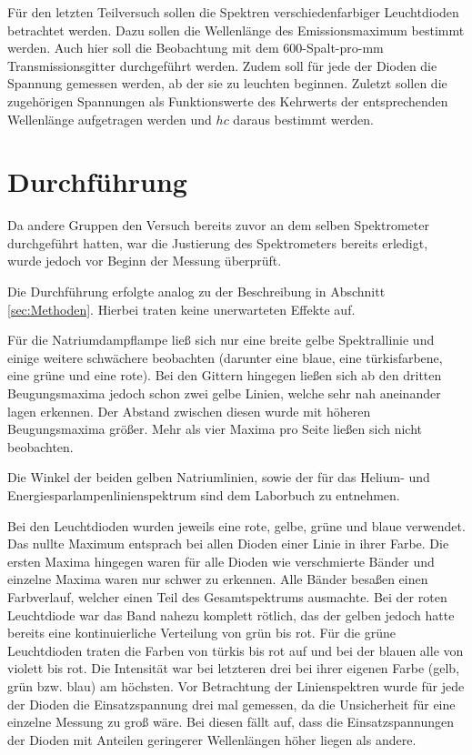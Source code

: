	Für den letzten Teilversuch sollen die Spektren verschiedenfarbiger Leuchtdioden betrachtet werden.
	Dazu sollen die Wellenlänge des Emissionsmaximum bestimmt werden.
	Auch hier soll die Beobachtung mit dem 600-Spalt-pro-\si{\milli\meter} Transmissionsgitter durchgeführt werden.
	Zudem soll für jede der Dioden die Spannung gemessen werden, ab der sie zu leuchten beginnen.
	Zuletzt sollen die zugehörigen Spannungen als Funktionswerte des Kehrwerts der entsprechenden Wellenlänge aufgetragen werden und $hc$ daraus bestimmt werden.
	
\section{Durchführung}
		
	Da andere Gruppen den Versuch bereits zuvor an dem selben Spektrometer durchgeführt hatten, war die Justierung des Spektrometers bereits erledigt, wurde jedoch vor Beginn der Messung überprüft.
	
	Die Durchführung erfolgte analog zu der Beschreibung in Abschnitt \ref{sec:Methoden}.
	Hierbei traten keine unerwarteten Effekte auf.
	
	Für die Natriumdampflampe ließ sich nur eine breite gelbe Spektrallinie und einige weitere schwächere beobachten (darunter eine blaue, eine türkisfarbene, eine grüne und eine rote).
	Bei den Gittern hingegen ließen sich ab den dritten Beugungsmaxima jedoch schon zwei gelbe Linien, welche sehr nah aneinander lagen erkennen.
	Der Abstand zwischen diesen wurde mit höheren Beugungsmaxima größer.
	Mehr als vier Maxima pro Seite ließen sich nicht beobachten.
	
	Die Winkel der beiden gelben Natriumlinien, sowie der für das Helium- und Energiesparlampenlinienspektrum sind dem Laborbuch zu entnehmen.
	
	Bei den Leuchtdioden wurden jeweils eine rote, gelbe, grüne und blaue verwendet.
	Das nullte Maximum entsprach bei allen Dioden einer Linie in ihrer Farbe.
	Die ersten Maxima hingegen waren für alle Dioden wie verschmierte Bänder und einzelne Maxima waren nur schwer zu erkennen.
	Alle Bänder besaßen einen Farbverlauf, welcher einen Teil des Gesamtspektrums ausmachte.
	Bei der roten Leuchtdiode war das Band nahezu komplett rötlich, das der gelben jedoch hatte bereits eine kontinuierliche Verteilung von grün bis rot.
	Für die grüne Leuchtdioden traten die Farben von türkis bis rot auf und bei der blauen alle von violett bis rot.
	Die Intensität war bei letzteren drei bei ihrer eigenen Farbe (gelb, grün bzw. blau) am höchsten.
	Vor Betrachtung der Linienspektren wurde für jede der Dioden die Einsatzspannung drei mal gemessen, da die Unsicherheit für eine einzelne Messung zu groß wäre.
	Bei diesen fällt auf, dass die Einsatzspannungen der Dioden mit Anteilen geringerer Wellenlängen höher liegen als andere.   
		
